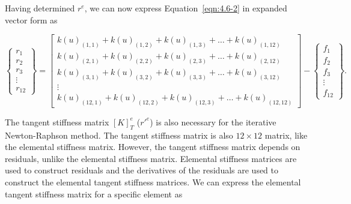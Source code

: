 \noindent Having determined $r^{e}$, we can now express Equation~\ref{eqn:4.6-2} in expanded vector form as

\begin{equation}
\begin{Bmatrix}
r_{1} \\
r_{2} \\
r_{3} \\
\vdots \\
r_{12}
\end{Bmatrix}
=
\begin{bmatrix}
k(u)_{(1,1)} + k(u)_{(1,2)} + k(u)_{(1,3)} + \hdots + k(u)_{(1,12)} \\
k(u)_{(2,1)} + k(u)_{(2,2)} + k(u)_{(2,3)} + \hdots + k(u)_{(2,12)} \\
k(u)_{(3,1)} + k(u)_{(3,2)} + k(u)_{(3,3)} + \hdots + k(u)_{(3,12)} \\
\vdots \\
k(u)_{(12,1)} + k(u)_{(12,2)} + k(u)_{(12,3)} + \hdots + k(u)_{(12,12)}
\end{bmatrix}
-
\begin{Bmatrix}
f_{1} \\ f_{2} \\ f_{3} \\ \vdots \\  f_{12}
\end{Bmatrix}.
\label{eqn:4.6-3}
\end{equation}

The tangent stiffness matrix $[K]_{T}^e$ ($r'^{e}$) is also necessary for the iterative Newton-Raphson method. The tangent stiffness matrix is also $12 \times 12$ matrix, like the elemental stiffness matrix. However, the tangent stiffness matrix depends on residuals, unlike the elemental stiffness matrix. Elemental stiffness matrices are used to construct residuals and the derivatives of the residuals are used to construct the elemental tangent stiffness matrices. We can express the elemental tangent stiffness matrix for a specific element as

